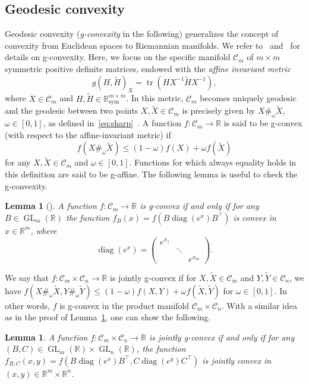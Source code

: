 \documentclass[a4paper]{article}
\newcommand{\R}{\mathbb{R}}
\newcommand{\caC}{\mathcal{C}}
\DeclareMathOperator{\tr}{tr}
\DeclareMathOperator{\diag}{diag}
\DeclareMathOperator{\GL}{GL}
\newtheorem{lemma}[theorem]{Lemma}
\theoremstyle{definition}
\numberwithin{equation}{section}
\begin{document}
\subsection{Geodesic convexity}\label{sec:g-convex-f}

Geodesic convexity (\emph{g-convexity} in the following) generalizes the concept of convexity from Euclidean spaces to Riemannian manifolds. We refer to~\cite[Chapter~11]{Boumal2023} and~\cite{Udriste1994} for details on g-convexity. Here, we focus on the specific manifold $\caC_m$ of $m \times m$ symmetric positive definite matrices, endowed with the \emph{affine invariant metric}
\[ 
 g(H, \tilde H)_{X} = \tr(H X^{-1} \tilde H X^{-1}),
\]
where $X \in \caC_m$ and $H, \tilde H \in \R^{m \times m}_{\mathrm{sym}}$. 
In this metric, $\caC_m$ becomes uniquely geodesic and the geodesic between two points $X, \tilde X \in \caC_m$ is precisely given by $X \#_\omega \tilde X$, $\omega \in [0,1]$, as defined in~\eqref{eq:sharp}~\cite[Theorem~6.1.6]{Bhatia2007}. A function $f: \caC_m \to \R$ is said to be g-convex (with respect to the affine-invariant metric) if
\[
 f(X \#_\omega \tilde X) \leq (1-\omega)f(X) + \omega f(\tilde X)
\]
for any $X, \tilde X \in \caC_m$ and $\omega \in [0,1]$. Functions for which always equality holds in this definition are said to be g-affine. The following lemma is useful to check the g-convexity.

\begin{lemma}[{\cite[Lemma~3.6]{Duembgen2016}}]\label{lem:g-convex}
 A function $f: \caC_m \to \R$ is g-convex if and only if for any $B \in \GL_m(\R)$ the function $f_B(x) = f(B\diag(e^x)B^\top)$ is convex in $x \in \R^m$, where 
 \[
 \diag(e^x) = \begin{pmatrix}
 e^{x_1} & & \\
 & \ddots & \\
 & & e^{x_m}
 \end{pmatrix}. 
\]
\end{lemma}

We say that $f : \caC_m \times \caC_n \to \R$ is jointly g-convex if for $X, \tilde X \in \caC_m$ and $Y, \tilde Y \in \caC_n$, we have $f(X \#_\omega \tilde X, Y \#_\omega \tilde Y) \leq (1-\omega)f(X, Y) + \omega f(\tilde X, \tilde Y)$ for $\omega \in [0,1]$. In other words, $f$ is g-convex in the product manifold $\caC_m \times \caC_n$. With a similar idea as in the proof of Lemma~\ref{lem:g-convex}, one can show the following.

\begin{lemma}\label{lem:jointly g-convex}
A function $f: \caC_m \times \caC_n \to \R$ is jointly g-convex if and only if for any $(B, C) \in \GL_m(\R) \times \GL_n(\R)$, the function $f_{B,C}(x, y) = f(B\diag(e^x)B^\top, C\diag(e^y)C^\top)$ is jointly convex in $(x, y) \in \R^m \times \R^n$. 
\end{lemma}
\end{document}
